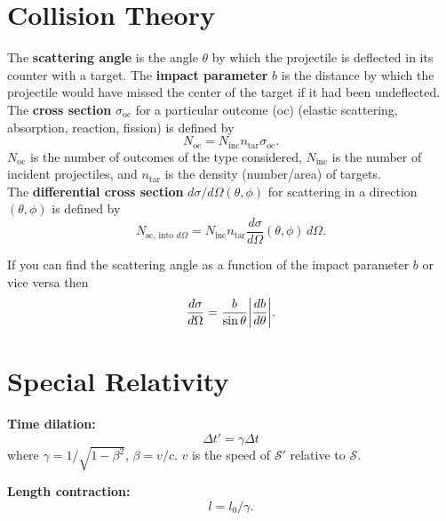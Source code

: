 \documentclass{book}
\theoremstyle{definition}
\newcommand{\be}{\beta}
\newcommand{\f}[2]{\frac{#1}{#2}}
\begin{document}
\section{Collision Theory}

The \textbf{scattering angle} is the angle $\theta$ by which the projectile is deflected in its counter with a target. The \textbf{impact parameter} $b$ is the distance by which the projectile would have missed the center of the target if it had been undeflected. \\


The \textbf{cross section} $\sigma_\text{oc}$ for a particular outcome (oc) (elastic scattering, absorption, reaction, fission) is defined by 
\begin{equation*}
N_\text{oc} = N_\text{inc} n_\text{tar} \sigma_\text{oc}.
\end{equation*}
$N_\text{oc}$ is the number of outcomes of the type considered, $N_\text{inc}$ is the number of incident projectiles, and $n_\text{tar}$ is the density (number/area) of targets. \\


The \textbf{differential cross section} $d\sigma/d\Omega (\theta,\phi)$ for scattering in a direction $(\theta,\phi)$ is defined by 
\begin{equation*}
N_\text{sc, into $d\Omega$} = N_\text{inc} n_\text{tar} \f{d\sigma}{d\Omega}(\theta,\phi) \,d\Omega.
\end{equation*}



If you can find the scattering angle as a function of the impact parameter $b$ or vice versa then 
\begin{equation*}
\f{d\sigma}{d\Omega} = \f{b}{\sin\theta} \abs{\f{db}{d\theta}}.
\end{equation*}



\section{Special Relativity}


\noindent \textbf{Time dilation:}
\begin{equation*}
\Delta t' = \gamma \Delta t
\end{equation*}
where $\gamma = 1/\sqrt{1-\beta^2}$, $\be = v/c$. $v$ is the speed of $\mathcal{S}'$ relative to $\mathcal{S}$.

\noindent \textbf{Length contraction:}
\begin{equation*}
l = l_0/\gamma.
\end{equation*}
\end{document}
